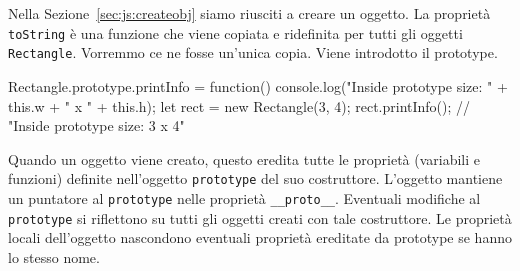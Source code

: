 Nella Sezione~\ref{sec:js:createobj} siamo riusciti a creare un oggetto. La proprietà \texttt{toString} è una funzione che viene copiata e ridefinita per tutti gli oggetti \texttt{Rectangle}. Vorremmo ce ne fosse un'unica copia. Viene introdotto il prototype.
\begin{javascriptcode}
Rectangle.prototype.printInfo = function() { 
    console.log("Inside prototype size: " + this.w + " x " + this.h); 
}
let rect = new Rectangle(3, 4);
rect.printInfo(); // "Inside prototype size: 3 x 4"
\end{javascriptcode}
Quando un oggetto viene creato, questo eredita tutte le proprietà (variabili e funzioni) definite nell'oggetto \texttt{prototype} del suo costruttore. L'oggetto mantiene un puntatore al \texttt{prototype} nelle proprietà \texttt{__proto__}. Eventuali modifiche al \texttt{prototype} si riflettono su tutti gli oggetti creati con tale costruttore. Le proprietà locali dell'oggetto nascondono eventuali proprietà ereditate da prototype se hanno lo stesso nome. 






























